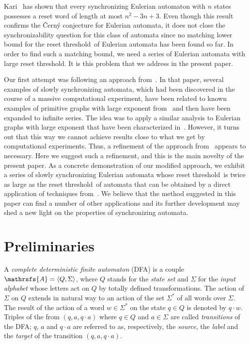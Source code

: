 \documentclass[11pt]{llncs}
\newcommand{\reth}{reset threshold}
\begin{document}
Kari~\cite{Ka03} has shown that every synchronizing Eulerian automaton with $n$
states possesses a reset word of length at most $n^2 -3n + 3$. Even though this
result confirms the \v{C}ern\'{y} conjecture for Eulerian automata, it does not
close the synchronizability question for this class of automata since no
matching lower bound for the \reth\ of Eulerian automata has been found so far.
In order to find such a matching bound, we need a series of Eulerian automata
with large \reth. It is this problem that we address in the present paper.

Our first attempt was following an approach from~\cite{AGV}. In that paper,
several examples of slowly synchronizing automata, which had been discovered in
the course of a massive computational experiment, have been related to known
examples of primitive graphs with large exponent from~\cite{DM64} and then have
been expanded to infinite series. The idea was to apply a similar analysis to
Eulerian graphs with large exponent that have been characterized
in~\cite{Shen00}. However, it turns out that this way we cannot achieve results
close to what we get by computational experiments. Thus, a refinement of the
approach from~\cite{AGV} appears to necessary. Here we suggest such a
refinement, and this is the main novelty of the present paper. As a concrete
demonstration of our modified approach, we exhibit a series of slowly
synchronizing Eulerian automata whose \reth\ is twice as large as the \reth\ of
automata that can be obtained by a direct application of techniques
from~\cite{AGV}. We believe that the method suggested in this paper can find a
number of other applications and its further development may shed a new light
on the properties of synchronizing automata.


\section{Preliminaries}
\label{preliminaries}
A \emph{complete deterministic finite automaton} (DFA) is
a couple $\mathrsfs{A}=\langle Q,\Sigma\rangle$, where $Q$ stands for the
\emph{state set} and $\Sigma$ for the \emph{input alphabet} whose letters act
on $Q$ by totally defined transformations. The action of $\Sigma$ on $Q$
extends in natural way to an action of the set $\Sigma^*$ of all words over
$\Sigma$. The result of the action of a word $w \in \Sigma^*$ on the state $q
\in Q$ is denoted by $q \cdot w$. Triples of the from $(q,a,q\cdot a)$ where
$q\in Q$ and $a\in\Sigma$ are called \emph{transitions} of the DFA; $q$, $a$
and $q\cdot a$ are referred to as, respectively, the \emph{source}, the
\emph{label} and the \emph{target} of the transition $(q,a,q\cdot a)$.
\end{document}
